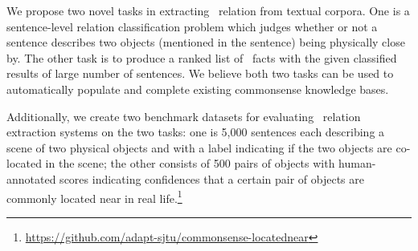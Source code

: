 We propose two novel tasks in extracting \lnear\ relation from textual corpora.
One is a sentence-level relation classification problem which 
judges whether or not
a sentence describes two objects (mentioned in the sentence) being
physically close by.
The other task is to produce a ranked list of \lnear\
facts with the given classified results of 
large number of sentences. 
We believe both two tasks can be used to automatically populate and complete
existing commonsense knowledge bases.

Additionally, we create two benchmark datasets for evaluating \lnear~relation extraction systems on the two tasks: one is 5,000 sentences 
each describing a scene of two physical objects and with a label indicating if the two objects are co-located in the scene; 
the other consists of 500 pairs of objects with human-annotated scores indicating confidences that a certain pair of objects are commonly located near in real life.\footnote{\url{https://github.com/adapt-sjtu/commonsense-locatednear}}

%

